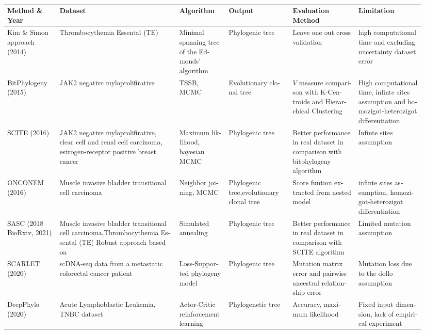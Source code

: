 \begin{sidewaystable}
	\caption{}
	\begin{latin}
		\centering
	    \tiny
		\begin{tabular}{|p{0.1\textheight}|p{0.14\textheight}|p{0.1\textheight}|p{0.1\textheight}|p{0.14\textheight}|p{0.14\textheight}|}
			\hline
			\rowcolor[gray]{0.9}
			Method \& Year & Dataset & Algorithm & Output & Evaluation Method & Limitation \\\hline
			Kim \& Simon approach (2014) &
			Thrombocythemia Essental (TE) &			
			Minimal spanning tree of the Edmonds’ algorithm &		
			Phylogenic tree &	
			Leave one out cross validation &
			high computational time and excluding uncertainty dataset error \\\hline
			BitPhylogeny (2015)&
			JAK2 negative myloprolifirative &
			TSSB, MCMC &
			Evolutionary clonal tree &
			$V$ measure comparison with K-Centroids  and Hierarchical Clustering &
			High computational time, infinte sites assumption and homozigot-heterozigot differentiation \\\hline
			SCITE (2016)&
			JAK2 negative myloprolifirative, clear cell and  renal cell carcinoma, estrogen-receptor positive breast cancer  &
			Maximum liklihood, bayesian MCMC &
			Phylogenic tree &
			Better performance in real dataset in comparison with bitphylogeny algorithm &
			Infinte sites assumption \\\hline
			ONCONEM (2016)&
			Muscle invasive bladder transitional cell carcinoma &
			Neighbor joining, MCMC &
			Phylogenic tree,evolutionary clonal tree &
			Score funtion extracted from nested model &
			infinte sites assumption, homozigot-heterozigot differentiation \\\hline
			SASC (2018 BioRxiv, 2021\cite{ciccolella2021inferring})&
			Muscle invasive bladder transitional cell carcinoma,Thrombocythemia Essental (TE)  
			Robust approach based on &
			Simulated annealing & 
			Phylogenic tree &
			Better performance in real dataset in comparison with SCITE algorithm &
			Limited mutation assumption \\\hline
			SCARLET (2020)&
			scDNA-seq data from a metastatic colorectal cancer patient &
			Loss-Supported phylogeny model &
			Phylogenic tree &
			Mutation matrix error and pairwise ancestral relationship error &
			Mutation loss due to the dollo assumption \\\hline
			DeepPhylo (2020)&
			Acute Lymphoblastic Leukemia, TNBC dataset &
			Actor-Critic reinforcement learning &
			Phylogenetic tree &
			Accuracy, maximum likelihood &
			Fixed input dimension, lack of empirical experiment \\\hline
		\end{tabular}
	\end{latin}
	\label{tab:ch_rw:comp_methods}
\end{sidewaystable}
